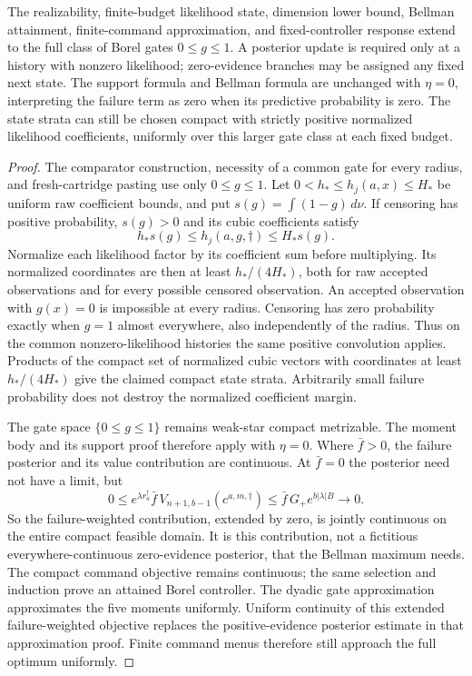 \begin{theorem}\label{thm:boundary}
The realizability, finite-budget likelihood state, dimension lower bound,
Bellman attainment, finite-command approximation, and fixed-controller
response extend to the full class of Borel gates $0\le g\le1$. A posterior
update is required only at a history with nonzero likelihood; zero-evidence
branches may be assigned any fixed next state. The support formula and
Bellman formula are unchanged with $\eta=0$, interpreting the failure term
as zero when its predictive probability is zero. The state strata can still
be chosen compact with strictly positive normalized likelihood coefficients,
uniformly over this larger gate class at each fixed budget.
\end{theorem}
\begin{proof}
The comparator construction, necessity of a common gate for every radius,
and fresh-cartridge pasting use only $0\le g\le1$. Let
$0<h_*\le h_j(a,x)\le H_*$ be uniform raw coefficient bounds, and put
$s(g)=\int(1-g)\,d\nu$. If censoring has positive probability, $s(g)>0$
and its cubic coefficients satisfy
\[
 h_*s(g)\le h_j(a,g,\dagger)\le H_*s(g).
\]
Normalize each likelihood factor by its coefficient sum before multiplying.
Its normalized coordinates are then at least $h_*/(4H_*)$, both for raw
accepted observations and for every possible censored observation. An
accepted observation with $g(x)=0$ is impossible at every radius. Censoring
has zero probability exactly when $g=1$ almost everywhere, also independently
of the radius. Thus on the common nonzero-likelihood histories the same
positive convolution applies. Products of the compact set of normalized
cubic vectors with coordinates at least $h_*/(4H_*)$ give the claimed compact
state strata. Arbitrarily small failure probability does not destroy the
normalized coefficient margin.

The gate space $\{0\le g\le1\}$ remains weak-star compact metrizable. The
moment body and its support proof therefore apply with $\eta=0$. Where
$\bar f>0$, the failure posterior and its value contribution are continuous.
At $\bar f=0$ the posterior need not have a limit, but
\[
 0\le e^{\lambda r_a^\dagger}\bar f\,
        V_{n+1,b-1}(c^{a,m,\dagger})
 \le \bar f\,G_+e^{b|\lambda|B}\longrightarrow0.
\]
So the failure-weighted contribution, extended by zero, is jointly
continuous on the entire compact feasible domain. It is this contribution,
not a fictitious everywhere-continuous zero-evidence posterior, that the
Bellman maximum needs. The compact command objective remains continuous;
the same selection and induction prove an attained Borel controller.
The dyadic gate approximation approximates the five moments uniformly.
Uniform continuity of this extended failure-weighted objective replaces
the positive-evidence posterior estimate in that approximation proof.
Finite command menus therefore still approach the full optimum uniformly.


\end{proof}
